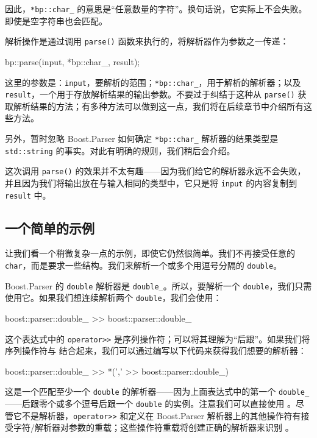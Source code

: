 因此，\texttt{*bp::char\_} 的意思是“任意数量的字符”。换句话说，它实际上不会失败。即使是空字符串也会匹配。

解析操作是通过调用 \texttt{parse()} 函数来执行的，将解析器作为参数之一传递：

\begin{code}
bp::parse(input, *bp::char_, result);
\end{code}

这里的参数是：\texttt{input}，要解析的范围；\texttt{*bp::char\_}，用于解析的解析器；以及 \texttt{result}，一个用于存放解析结果的输出参数。不要过于纠结于这种从 \texttt{parse()} 获取解析结果的方法；有多种方法可以做到这一点，我们将在后续章节中介绍所有这些方法。

另外，暂时忽略 Boost.Parser 如何确定 \texttt{*bp::char\_} 解析器的结果类型是 \texttt{std::string} 的事实。对此有明确的规则，我们稍后会介绍。

这次调用 \texttt{parse()} 的效果并不太有趣——因为我们给它的解析器永远不会失败，并且因为我们将输出放在与输入相同的类型中，它只是将 \texttt{input} 的内容复制到 \texttt{result} 中。

\subsection{一个简单的示例}

让我们看一个稍微复杂一点的示例，即使它仍然很简单。我们不再接受任意的 \texttt{char}，而是要求一些结构。我们来解析一个或多个用逗号分隔的 \texttt{double}。

Boost.Parser 的 \texttt{double} 解析器是 \texttt{double\_}。所以，要解析一个 \texttt{double}，我们只需使用它。如果我们想连续解析两个 \texttt{double}，我们会使用：

\begin{code}
boost::parser::double_ >> boost::parser::double_
\end{code}

这个表达式中的 \texttt{operator>>} 是序列操作符；可以将其理解为“后跟”。如果我们将序列操作符与 结合起来，我们可以通过编写以下代码来获得我们想要的解析器：

\begin{code}
boost::parser::double_ >> *(',' >> boost::parser::double_)
\end{code}

这是一个匹配至少一个 \texttt{double} 的解析器——因为上面表达式中的第一个 \texttt{double\_}——后跟零个或多个逗号后跟一个 \texttt{double} 的实例。注意我们可以直接使用 。尽管它不是解析器，\texttt{operator>>} 和定义在 Boost.Parser 解析器上的其他操作符有接受字符/解析器对参数的重载；这些操作符重载将创建正确的解析器来识别 。

